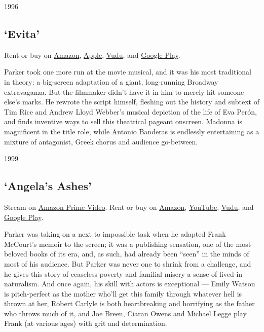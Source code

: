 1996

\hypertarget{evita}{%
\subsection{`Evita'}\label{evita}}

Rent or buy on
\href{https://www.amazon.com/gp/video/detail/B004KAWC0C/ref=atv_dp_share_cu_r}{Amazon},
\href{https://itunes.apple.com/us/movie/evita/id281767145?ign-mpt=uo\%3D4}{Apple},
\href{https://www.vudu.com/content/movies/details/Evita/12642}{Vudu},
and
\href{https://play.google.com/store/movies/details/Evita?gl=US\&hl=en\&id=5hB82j5xTJg\&PAffiliateID=110l4uj}{Google
Play}.

Parker took one more run at the movie musical, and it was his most
traditional in theory: a big-screen adaptation of a giant, long-running
Broadway extravaganza. But the filmmaker didn't have it in him to merely
hit someone else's marks. He rewrote the script himself, fleshing out
the history and subtext of Tim Rice and Andrew Lloyd Webber's musical
depiction of the life of Eva Perón, and finds inventive ways to sell
this theatrical pageant onscreen. Madonna is magnificent in the title
role, while Antonio Banderas is endlessly entertaining as a mixture of
antagonist, Greek chorus and audience go-between.

1999

\hypertarget{angelas-ashes}{%
\subsection{`Angela's Ashes'}\label{angelas-ashes}}

Stream on
\href{https://www.amazon.com/gp/video/detail/B07D7N1HTG/ref=atv_dl_rdr?tag=justwatch09-20}{Amazon
Prime Video}. Rent or buy on
\href{https://www.amazon.com/gp/video/detail/B002RTFHUU/ref=atv_dp_share_cu_r}{Amazon},
\href{https://www.youtube.com/watch?v=t0f6cUCQthY}{YouTube},
\href{https://www.vudu.com/content/movies/details/Angelas-Ashes/16111}{Vudu},
and
\href{https://play.google.com/store/movies/details/Angela_s_Ashes?gl=US\&hl=en\&id=t0f6cUCQthY\&PAffiliateID=110l4uj}{Google
Play}.

Parker was taking on a next to impossible task when he adapted Frank
McCourt's memoir to the screen; it was a publishing sensation, one of
the most beloved books of its era, and, as such, had already been
``seen'' in the minds of most of his audience. But Parker was never one
to shrink from a challenge, and he gives this story of ceaseless poverty
and familial misery a sense of lived-in naturalism. And once again, his
skill with actors is exceptional --- Emily Watson is pitch-perfect as
the mother who'll get this family through whatever hell is thrown at
her, Robert Carlyle is both heartbreaking and horrifying as the father
who throws much of it, and Joe Breen, Ciaran Owens and Michael Legge
play Frank (at various ages) with grit and determination.

